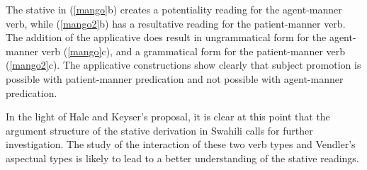 \documentclass[output=paper]{langscibook}
\begin{document}
\begin{exe}
\ex\label{mango}
\begin{xlist}
\end{xlist}

\ex\label{mango2}
{ 
\begin{xlist}
\end{xlist}
}
\end{exe}
The stative in (\ref{mango}b) creates a potentiality reading for the agent-manner verb, while (\ref{mango2}b) has a resultative reading for the patient-manner verb. The addition of the applicative does result in ungrammatical form for the agent-manner verb (\ref{mango}c), and a grammatical form for the patient-manner verb (\ref{mango2}c). The applicative constructions show clearly that subject promotion is possible with patient-manner predication and not possible with agent-manner predication.
           
In the light of Hale and Keyser’s proposal, it is clear at this point that the argument structure of the stative derivation in Swahili calls for further investigation. The study of the interaction of these two verb types and Vendler’s aspectual types is likely to lead to a better understanding of the stative readings. 
\end{document}
